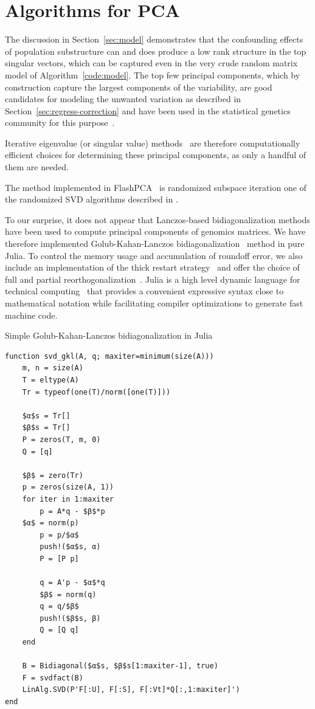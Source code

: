 \documentclass[review]{siamart0516}
\begin{document}
\section{Algorithms for PCA}

The discussion in Section~\ref{sec:model} demonstrates that the confounding
effects of population substructure can and does produce a low rank structure in
the top singular vectors, which can be captured even in the very crude random
matrix model of Algorithm~\ref{code:model}. The top few principal components,
which by construction capture the largest components of the variability, are
good candidates for modeling the unwanted variation as described in
Section~\ref{sec:regress-correction} and have been used in the statistical
genetics community for this
purpose~\cite{Chen2003,Patterson2006,Price2006,Zhu2002,Zhang2003}.

Iterative eigenvalue (or singular value)
methods~\cite{Bai2000} are therefore computationally efficient choices for
determining these principal components, as only a handful of them are needed.

The method implemented in FlashPCA~\cite{abraham2014fast} is randomized
subspace iteration one of the randomized SVD algorithms described in
\cite{halko2011finding}.

To our surprise, it does not appear that Lanczos-based bidiagonalization
methods have been used to compute principal components of genomics matrices.
We have therefore implemented Golub-Kahan-Lanczos bidiagonalization~\cite{Golub1965}
method in pure Julia. To control the memory usage and accumulation of
roundoff error, we also include an implementation of the thick restart
strategy~\cite{Stewart2001,Baglama2005} and offer the choice of full and
partial reorthogonalization~\cite{Simon1984,Larsen1998}.
Julia is a high level dynamic language for technical computing~\cite{Bezanson2012,Bezanson2015}
that provides a convenient expressive syntax close to mathematical
notation while facilitating compiler optimizations to generate fast machine
code.

\begin{algorithm}
\caption{Simple Golub-Kahan-Lanczos bidiagonalization in Julia}

\begin{lstlisting}
function svd_gkl(A, q; maxiter=minimum(size(A)))
    m, n = size(A)
    T = eltype(A)
    Tr = typeof(one(T)/norm([one(T)]))

    $α$s = Tr[]
    $β$s = Tr[]
    P = zeros(T, m, 0)
    Q = [q]

    $β$ = zero(Tr)
    p = zeros(size(A, 1))
    for iter in 1:maxiter
        p = A*q - $β$*p
	$α$ = norm(p)
        p = p/$α$
        push!($α$s, α)
        P = [P p]

        q = A'p - $α$*q
        $β$ = norm(q)
        q = q/$β$
        push!($β$s, β)
        Q = [Q q]
    end

    B = Bidiagonal($α$s, $β$s[1:maxiter-1], true)
    F = svdfact(B)
    LinAlg.SVD(P'F[:U], F[:S], F[:Vt]*Q[:,1:maxiter]')
end
\end{lstlisting}
\end{algorithm}
\end{document}
